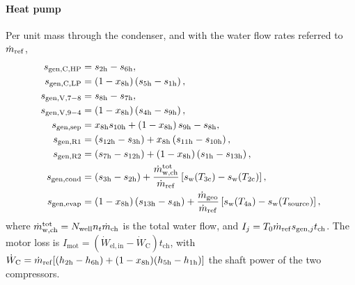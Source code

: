 \paragraph{Heat pump} Per unit mass through the condenser, and with the water
flow rates referred to $\dot m_\mathrm{ref}$,
\begin{align}
  s_{\mathrm{gen,C,HP}}&=s_\mathrm{2h}-s_\mathrm{6h},\notag\\
  s_{\mathrm{gen,C,LP}}&=\left(1-x_\mathrm{8h}\right)\left(s_\mathrm{5h}-s_\mathrm{1h}\right),
  \notag\\
  s_{\mathrm{gen,V,7-8}}&=s_\mathrm{8h}-s_\mathrm{7h},\notag\\
  s_{\mathrm{gen,V,9-4}}&=\left(1-x_\mathrm{8h}\right)\left(s_\mathrm{4h}-s_\mathrm{9h}\right),
  \notag\\
  s_{\mathrm{gen,sep}}&=x_\mathrm{8h}s_\mathrm{10h}+\left(1-x_\mathrm{8h}\right)s_\mathrm{9h}-s_\mathrm{8h},\notag\\
  s_{\mathrm{gen,R1}}&=\left(s_\mathrm{12h}-s_\mathrm{3h}\right)+x_\mathrm{8h}\left(s_\mathrm{11h}-s_\mathrm{10h}\right),
  \notag\\
  s_{\mathrm{gen,R2}}&=\left(s_\mathrm{7h}-s_\mathrm{12h}\right)+\left(1-x_\mathrm{8h}\right)\left(s_\mathrm{1h}-s_\mathrm{13h}\right),\notag\\
  s_{\mathrm{gen,cond}}&=\left(s_\mathrm{3h}-s_\mathrm{2h}\right)
     +\frac{\dot m_\mathrm{w,ch}^\mathrm{tot}}{\dot m_\mathrm{ref}}
      \left[s_\mathrm{w}(T_\mathrm{3c})-s_\mathrm{w}(T_\mathrm{2c})\right],
  \notag\\
  s_{\mathrm{gen,evap}}&=\left(1-x_\mathrm{8h}\right)\left(s_\mathrm{13h}-s_\mathrm{4h}\right)
     +\frac{\dot m_\mathrm{geo}}{\dot m_\mathrm{ref}}
      \left[s_\mathrm{w}(T_\mathrm{4a})-s_\mathrm{w}(T_\mathrm{source})\right],
  \label{eq:sgen-hp}
\end{align}
where $\dot m_\mathrm{w,ch}^\mathrm{tot}=N_{\mathrm{well}} n_t\dot m_\mathrm{ch}$ is the total
water flow, and $I_j=T_0\dot m_\mathrm{ref}s_{\mathrm{gen},j}t_\mathrm{ch}$. The
motor loss is
$I_\mathrm{mot}=(\dot W_\mathrm{el,in}-\dot W_\mathrm{C})t_\mathrm{ch}$, with
$\dot W_\mathrm{C}=\dot m_\mathrm{ref}[(h_\mathrm{2h}-h_\mathrm{6h})
+(1-x_\mathrm{8h})(h_\mathrm{5h}-h_\mathrm{1h})]$ the shaft power of the two
compressors.

